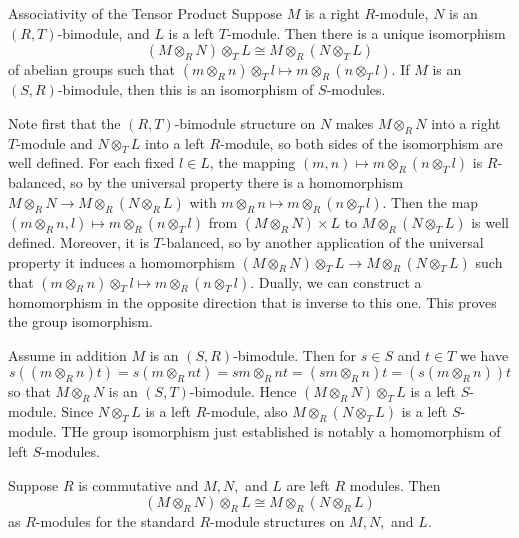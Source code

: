 \documentclass[12pt, a4paper, twoside, openright, titlepage]{book}
\begin{document}
\begin{thm}{Associativity of the Tensor Product}{}
    Suppose $M$ is a right $R$-module, $N$ is an $(R,T)$-bimodule, and $L$ is a left $T$-module. Then there is a unique isomorphism \begin{equation*}
        (M\otimes_RN)\otimes_TL \cong M\otimes_R(N\otimes_TL)
    \end{equation*}
    of abelian groups such that $(m\otimes_Rn)\otimes_Tl\mapsto m\otimes_R(n\otimes_Tl)$. If $M$ is an $(S,R)$-bimodule, then this is an isomorphism of $S$-modules.
\end{thm}
\begin{proof*}{}{}
    Note first that the $(R,T)$-bimodule structure on $N$ makes $M\otimes_RN$ into a right $T$-module and $N\otimes_TL$ into a left $R$-module, so both sides of the isomorphism are well defined. For each fixed $l \in L$, the mapping $(m,n)\mapsto m\otimes_R(n\otimes_Tl)$ is $R$-balanced, so by the universal property there is a homomorphism $M\otimes_RN\rightarrow M\otimes_R(N\otimes_RL)$ with $m\otimes_Rn\mapsto m\otimes_R(n\otimes_Tl)$. Then the map $(m\otimes_Rn,l)\mapsto m\otimes_R(n\otimes_Tl)$ from $(M\otimes_RN)\times L$ to $M\otimes_R(N\otimes_TL)$ is well defined. Moreover, it is $T$-balanced, so by another application of the universal property it induces a homomorphism $(M\otimes_RN)\otimes_TL\rightarrow M\otimes_R(N\otimes_TL)$ such that $(m\otimes_Rn)\otimes_Tl \mapsto m\otimes_R(n\otimes_Tl)$. Dually, we can construct a homomorphism in the opposite direction that is inverse to this one. This proves the group isomorphism. 

    Assume in addition $M$ is an $(S,R)$-bimodule. Then for $s \in S$ and $t \in T$ we have \begin{equation*}
        s((m\otimes_Rn)t) = s(m\otimes_Rnt) = sm\otimes_Rnt = (sm\otimes_Rn)t = (s(m\otimes_Rn))t
    \end{equation*}
    so that $M\otimes_RN$ is an $(S,T)$-bimodule. Hence $(M\otimes_RN)\otimes_TL$ is a left $S$-module. Since $N\otimes_TL$ is a left $R$-module, also $M\otimes_R(N\otimes_TL)$ is a left $S$-module. THe group isomorphism just established is notably a homomorphism of left $S$-modules.
\end{proof*}

\begin{cor}{}{}
    Suppose $R$ is commutative and $M,N,$ and $L$ are left $R$ modules. Then \begin{equation*}
        (M\otimes_RN)\otimes_RL\cong M\otimes_R(N\otimes_RL)
    \end{equation*}
    as $R$-modules for the standard $R$-module structures on $M,N,$ and $L$.
\end{cor}
\end{document}
